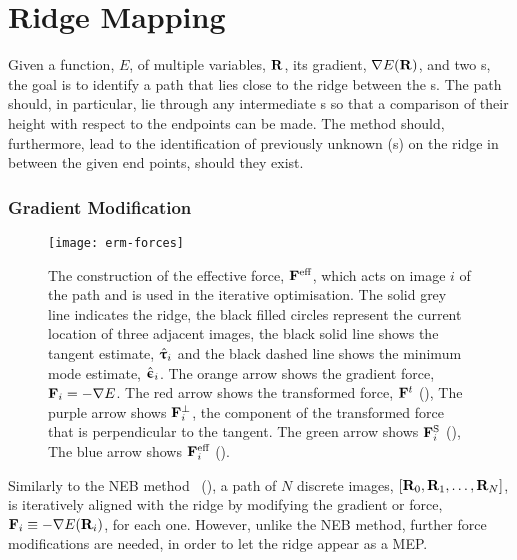 \section{Ridge Mapping}
\label{sec:ridge-mapping}

Given a function, $E$, of multiple variables, ${\mathrm{\mathbf{\bm{R}}}}$, its gradient, $\nabla E({\mathrm{\mathbf{\bm{R}}}})$, and two s, the goal is to identify a path that lies close to the ridge between the s.
The path should, in particular, lie through any intermediate s so that a comparison of their height with respect to the endpoints can be made.
The method should, furthermore, lead to the identification of previously unknown (s) on the ridge in between the given end points, should they exist.

\subsubsection{Gradient Modification}
\begin{figure}[h]
\begin{center}
\texttt{[image: erm-forces]}
    \parbox{0.85\linewidth}{
\caption{
The construction of the effective force, ${\mathrm{\mathbf{\bm{F}}}}^\text{eff}$,
which acts on image $i$ of the path and is used in the iterative optimisation.
The solid grey line indicates the ridge,
the black filled circles represent the current location of three adjacent images,
the black solid line shows the tangent estimate, $\hat{{\mathrm{\mathbf{\bm{\uptau}}}}}_i$
and the black dashed line shows the minimum mode estimate, $\hat{{\mathrm{\mathbf{\bm{\upepsilon}}}}}_i$.
The orange arrow shows the gradient force, ${\mathrm{\mathbf{\bm{F}}}}_i= -\nabla E$.
The red arrow shows the transformed force, ${\mathrm{\mathbf{\bm{F}}}}^t$ (),
The purple arrow shows ${\mathrm{\mathbf{\bm{F}}}}_i^\perp$, the component of the transformed force that is perpendicular to the tangent.
The green arrow shows ${\mathrm{\mathbf{\bm{F}}}}_i^\text{S}$ (), %
The blue arrow shows ${\mathrm{\mathbf{\bm{F}}}}_i^\text{eff}$ ().
}
\label{fig:erm-forces}
}
\end{center}
\end{figure}


Similarly to the NEB method~\cite{neb-original-1998} (), a path of $N$ discrete images, $[{\mathrm{\mathbf{\bm{R}}}}_0, {\mathrm{\mathbf{\bm{R}}}}_1, \ldots, {\mathrm{\mathbf{\bm{R}}}}_N]$, is iteratively aligned with the ridge by modifying the gradient or force, ${\mathrm{\mathbf{\bm{F}}}}_i \equiv -\nabla E({\mathrm{\mathbf{\bm{R}}}}_i)$, for each one.
However, unlike the NEB method, further force modifications are needed, in order to let the ridge appear as a MEP.

